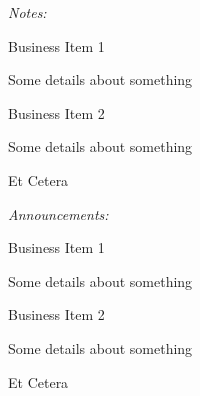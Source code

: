 \documentclass[10pt,a4paper,twoside]{mins}
\begin{document}
\begin{minutes}

    \begin{center}
        \emph{Notes:}
    \end{center}
    
    \begin{notes}
        \item Business Item 1

        Some details about something

        \item Business Item 2

        Some details about something

        \item Et Cetera

    \end{notes}

    \begin{center}
        \emph{Announcements:}
    \end{center}

    \begin{notes}
        \item Business Item 1
    
        Some details about something
    
        \item Business Item 2
    
        Some details about something
    
        \item Et Cetera
    
    \end{notes}

\end{minutes}
\end{document}
